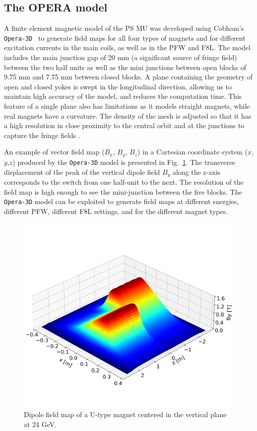 \documentclass[a4paper,
               biblatex,     %
               keeplastbox,   %
               ]{jacow}
\begin{document}
\subsection{The OPERA model}
A finite element magnetic model of the PS MU was developed using Cobham's \texttt{Opera-3D}~\cite{noauthor_opera_nodate, anglada_pxmu_hrcwp_nodate} to generate field maps for all four types of magnets and for different excitation currents in the main coils, as well as in the PFW and F8L. The model includes the main junction gap of 20 mm (a significant source of fringe field) between the two half units as well as the mini junctions between open blocks of 9.75 mm and 7.75 mm between closed blocks. A plane containing the geometry of open and closed yokes is swept in the longitudinal direction, allowing us to maintain high accuracy of the model, and reduces the computation time. This feature of a single plane also has limitations as it models straight magnets, while real magnets have a curvature. The density of the mesh is adjusted so that it has a high resolution in close proximity to the central orbit and at the junctions to capture the fringe fields \cite{anglada_reference_2019}.

An example of vector field map ($B_x$, $B_y$, $B_z$) in a Cartesian coordinate system ($x$,$y$,$z$) produced by the \texttt{Opera-3D} model is presented in Fig.~\ref{fig:dipole_field}. The transverse displacement of the peak of the vertical dipole field $B_{y}$ along the z-axis corresponds to the switch from one half-unit to the next. The resolution of the field map is high enough to see the mini-junction between the five blocks. The \texttt{Opera-3D} model can be exploited to generate field maps at different energies, different PFW, different F8L settings, and for the different magnet types. 

\begin{figure}[!htb]
   \centering
   \includegraphics*[width=1.0\columnwidth, trim={0 2.9cm 0 4.3cm},clip]{MOPOTK030_f3.png}
   \caption{Dipole field map of a U-type magnet centered in the vertical plane at 24 GeV.}
   \label{fig:dipole_field}
\end{figure}
\end{document}
